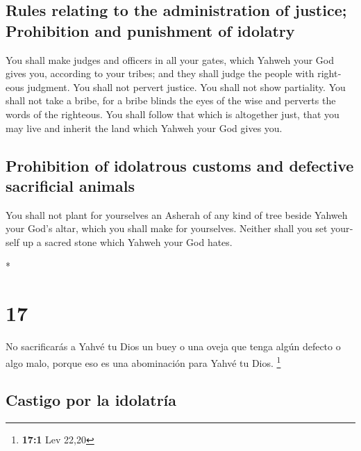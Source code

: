 \begin{paracol}{2}
\begin{otherlanguage}{english}
\hypertarget{rules-relating-to-the-administration-of-justice-prohibition-and-punishment-of-idolatry}{%
\subsection{Rules relating to the administration of justice; Prohibition
and punishment of
idolatry}\label{rules-relating-to-the-administration-of-justice-prohibition-and-punishment-of-idolatry}}

 You shall make judges and officers in all your gates,
which Yahweh your God gives you, according to your tribes; and they
shall judge the people with righteous judgment.  You
shall not pervert justice. You shall not show partiality. You shall not
take a bribe, for a bribe blinds the eyes of the wise and perverts the
words of the righteous.  You shall follow that which is
altogether just, that you may live and inherit the land which Yahweh
your God gives you.

\hypertarget{prohibition-of-idolatrous-customs-and-defective-sacrificial-animals}{%
\subsection{Prohibition of idolatrous customs and defective sacrificial
animals}\label{prohibition-of-idolatrous-customs-and-defective-sacrificial-animals}}

 You shall not plant for yourselves an Asherah of any
kind of tree beside Yahweh your God's altar, which you shall make for
yourselves.  Neither shall you set yourself up a sacred
stone which Yahweh your God hates.

\end{otherlanguage}

\switchcolumn[0]*

\hypertarget{section-32}{%
\section{17}\label{section-32}}

 No sacrificarás a Yahvé tu Dios un buey o una oveja que
tenga algún defecto o algo malo, porque eso es una abominación para
Yahvé tu Dios. \footnote{\textbf{17:1} Lev 22,20}

\hypertarget{castigo-por-la-idolatruxeda}{%
\subsection{Castigo por la
idolatría}\label{castigo-por-la-idolatruxeda}}


\end{paracol}
